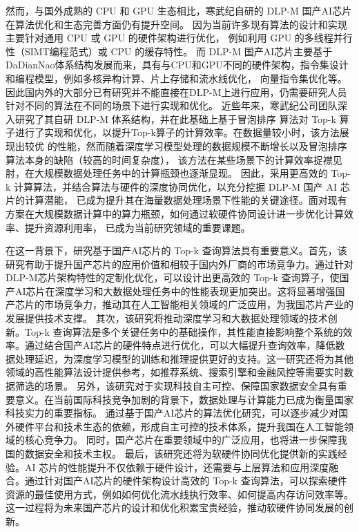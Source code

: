 然而，与国外成熟的 CPU 和 GPU 生态相比，寒武纪自研的 DLP-M 国产AI芯片在算法优化和生态完善方面仍有提升空间。
因为当前许多现有算法的设计和实现主要针对通用 CPU 或 GPU 的硬件架构进行优化，
例如利用 GPU 的多线程并行性（SIMT编程范式）\cite{ghorpade2012gpgpu}或 CPU 的缓存特性\cite{hill2002evaluating}。
而 DLP-M 国产AI芯片主要基于DaDianNao体系结构发展而来，具有与CPU和GPU不同的硬件架构，指令集设计和编程模型，例如多核异构计算、片上存储和流水线优化，
向量指令集优化等\cite{7011421}。
因此国内外的大部分已有研究并不能直接在DLP-M上进行应用，仍需要研究人员针对不同的算法在不同的场景下进行实现和优化。
近些年来，寒武纪公司团队深入研究了其自研 DLP-M 体系结构，并在此基础上基于冒泡排序
算法对 Top-k 算子进行了实现和优化，以提升Top-k算子的计算效率。在数据量较小时，该方法展现出较优
的性能，然而随着深度学习模型处理的数据规模不断增长以及冒泡排序算法本身的缺陷（较高的时间复杂度），
该方法在某些场景下的计算效率捉襟见肘，在大规模数据处理任务中的计算瓶颈也逐渐显现。
因此，采用更高效的 Top-k 计算算法，并结合算法与硬件的深度协同优化，以充分挖掘 DLP-M 国产 AI 芯片的计算潜能，
已成为提升其在海量数据处理场景下性能的关键途径。面对现有方案在大规模数据计算中的算力瓶颈，如何通过软硬件协同设计进一步优化计算效率、提升资源利用率，
已成为当前研究领域的重要课题。

在这一背景下，研究基于国产AI芯片的 Top-k 查询算法具有重要意义。首先，该研究有助于提升国产芯片的应用价值和相较于国内外厂商的市场竞争力。通过针对DLP-M芯片架构特性的定制化优化，可以设计出更高效的 Top-k 查询算子，使国产AI芯片在深度学习和大数据处理任务中的性能表现更加突出。这将显著增强国产芯片的市场竞争力，推动其在人工智能相关领域的广泛应用，为我国芯片产业的发展提供技术支撑。
其次，该研究将推动深度学习和大数据处理领域的技术创新。Top-k 查询算法是多个关键任务中的基础操作，其性能直接影响整个系统的效率。通过结合国产AI芯片的硬件特点进行优化，可以大幅提升查询效率，降低数据处理延迟，为深度学习模型的训练和推理提供更好的支持。这一研究还将为其他领域的高性能算法设计提供参考，如推荐系统、搜索引擎和金融风控等需要实时数据筛选的场景。
另外，该研究对于实现科技自主可控、保障国家数据安全具有重要意义。在当前国际科技竞争加剧的背景下，数据处理与计算能力已成为衡量国家科技实力的重要指标。
通过基于国产AI芯片的算法优化研究，可以逐步减少对国外硬件平台和技术生态的依赖，形成自主可控的技术体系，提升我国在人工智能领域的核心竞争力。
同时，国产芯片在重要领域中的广泛应用，也将进一步保障我国的数据安全和技术主权\cite{durhambattle}。
最后，该研究还将为软硬件协同优化提供新的实践经验。AI 芯片的性能提升不仅依赖于硬件设计，还需要与上层算法和应用深度融合。通过针对国产AI芯片的硬件架构设计高效的 Top-k 查询算法，可以探索硬件资源的最佳使用方式，例如如何优化流水线执行效率、如何提高内存访问效率等。这一过程将为未来国产芯片的设计和优化积累宝贵经验，推动软硬件协同发展的创新。

